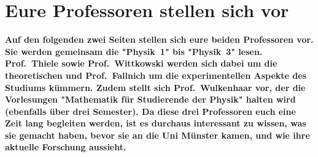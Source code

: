 \section[Eure Profs stellen sich vor]{Eure Professoren stellen sich vor}
\textbf{Auf den folgenden zwei Seiten stellen sich eure beiden Professoren vor.
    Sie werden gemeinsam die "Physik~1" bis "Physik~3" lesen.
    Prof.\ Thiele sowie Prof.\ Wittkowski werden sich dabei um die theoretischen und Prof.\ Fallnich um die experimentellen Aspekte des Studiums kümmern.
    Zudem stellt sich Prof.\ Wulkenhaar vor, der die Vorlesungen "Mathematik für Studierende der Physik" halten wird (ebenfalls über drei Semester).
	Da diese drei Professoren euch eine Zeit lang begleiten werden, ist es durchaus interessant zu wissen, was sie gemacht haben, bevor sie an die Uni Münster kamen, und wie ihre aktuelle Forschung aussieht.}

